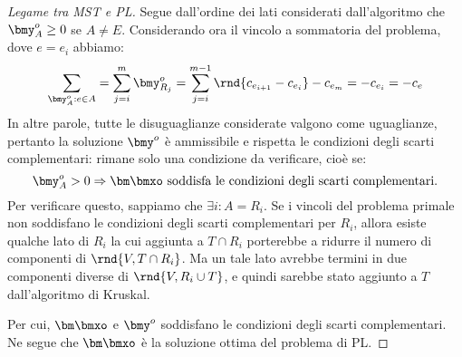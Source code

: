 \documentclass[\main/main.tex]{subfiles}
\begin{document}
\begin{proof}[Legame tra MST e PL]
  Segue dall'ordine dei lati considerati dall'algoritmo che \(\bmy^o_A \geq 0\) se \(A\neq E\). Considerando ora il vincolo a sommatoria del problema, dove \(e=e_i\) abbiamo:
  \[
    \sum_{\bmy^o_A: e \in A} = \sum_{j=i}^m \bmy^o_{R_j} = \sum_{j=i}^{m-1}\rnd{c_{e_{i+1}}-c_{e_i}} - c_{e_m} = -c_{e_i} = -c_e
  \]
  In altre parole, tutte le disuguaglianze considerate valgono come uguaglianze, pertanto la soluzione \(\bmy^o\) è ammissibile e rispetta le condizioni degli scarti complementari: rimane solo una condizione da verificare, cioè se:
  \[
    \bmy^o_A > 0 \Rightarrow \bm\bmxo \text{ soddisfa le condizioni degli scarti complementari.}
  \]
  Per verificare questo, sappiamo che \(\exists i: A = R_i\). Se i vincoli del problema primale non soddisfano le condizioni degli scarti complementari per \(R_i\), allora esiste qualche lato di \(R_i\) la cui aggiunta a \(T\cap R_i\) porterebbe a ridurre il numero di componenti di \(\rnd{V, T \cap R_i}\). Ma un tale lato avrebbe termini in due componenti diverse di \(\rnd{V, R_i \cup T}\), e quindi sarebbe stato aggiunto a \(T\) dall'algoritmo di Kruskal.

  Per cui, \(\bm\bmxo\) e \(\bmy^o\) soddisfano le condizioni degli scarti complementari. Ne segue che \(\bm\bmxo\) è la soluzione ottima del problema di PL.
\end{proof}
\end{document}
